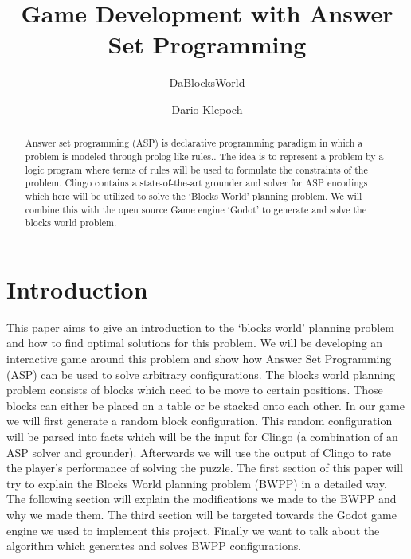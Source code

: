 \documentclass[runningheads]{llncs}
\begin{document}
\lstset{
    language=prolog,
    autogobble=true,
    numbers=left
}

\title{Game Development with Answer Set Programming}
\subtitle{DaBlocksWorld}
\author{Dario Klepoch}
\maketitle        

    \begin{abstract}
        Answer set programming (ASP) is declarative programming paradigm in which a problem is modeled through prolog-like rules..
        The idea is to represent a problem by a logic program where terms of rules will be used to formulate the constraints of the problem.
        Clingo contains a state-of-the-art grounder and solver for ASP encodings
        which here will be utilized to solve the `Blocks World' planning problem.
        We will combine this with the open source Game engine `Godot' to generate and solve the blocks world problem.
    \end{abstract}


    \section{Introduction}
        This paper aims to give an introduction to the `blocks world' planning problem and how to find optimal solutions for this problem.
        We will be developing an interactive game around this problem and show how Answer Set Programming (ASP) can
        be used to solve arbitrary configurations.\newline
        The blocks world planning problem consists of blocks which need to be move to certain positions.
        Those blocks can either be placed on a table or be stacked onto each other.
        In our game we will first generate a random block configuration.
        This random configuration will be parsed into facts which will be the input for Clingo (a combination of an ASP solver and grounder).
        Afterwards we will use the output of Clingo to rate the player's performance of solving the puzzle.\newline
        The first section of this paper will try to explain the Blocks World planning problem (BWPP) in a detailed way.
        The following section will explain the modifications we made to the BWPP and why we made them.
        The third section will be targeted towards the Godot game engine we used to implement this project.
        Finally we want to talk about the algorithm which generates and solves BWPP configurations.
\end{document}
